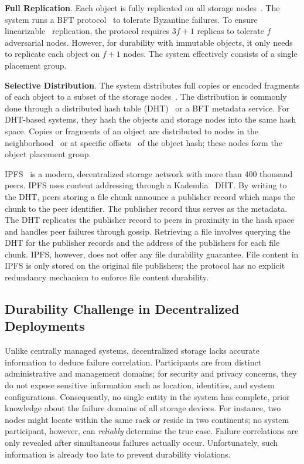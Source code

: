 \noindent\textbf{Full Replication}.
Each object is fully replicated on all storage nodes~\cite{bitcoin,ethereum,fabric}.
The system runs a BFT protocol~\cite{pbft,hotstuff,algorand} to tolerate Byzantine failures.
To ensure linearizable~\cite{linearizability} replication, the protocol requires $3f + 1$ replicas to tolerate $f$ adversarial nodes.
However, for durability with immutable objects, it only needs to replicate each object on $f + 1$ nodes.
The system effectively consists of a single placement group.

\noindent\textbf{Selective Distribution}.
The system distributes full copies or encoded fragments of each object to a subset of the storage nodes~\cite{farsite,past,cfs,glacier,carbonite,irisstore}.
The distribution is commonly done through a distributed hash table (DHT)~\cite{chash,chord,kademlia} or a BFT metadata service.
For DHT-based systems, they hash the objects and storage nodes into the same hash space.
Copies or fragments of an object are distributed to nodes in the neighborhood~\cite{cfs,past,carbonite} or at specific offsets~\cite{glacier} of the object hash;
these nodes form the object placement group.

IPFS~\cite{ipfs} is a modern, decentralized storage network with more than 400 thousand peers.
IPFS uses content addressing through a Kademlia~\cite{kademlia} DHT.
By writing to the DHT, peers storing a file chunk announce a publisher record which maps the chunk to the peer identifier.
The publisher record thus serves as the metadata.
The DHT replicates the publisher record to peers in proximity in the hash space and handles peer failures through gossip.
Retrieving a file involves querying the DHT for the publisher records and the address of the publishers for each file chunk.
IPFS, however, does not offer any file durability guarantee.
File content in IPFS is only stored on the original file publishers;
the protocol has no explicit redundancy mechanism to enforce file content durability.

\subsection{Durability Challenge in Decentralized Deployments}
\label{sec:background:loss}

Unlike centrally managed systems, decentralized storage lacks accurate information to deduce failure correlation.
Participants are from distinct administrative and management domains;
for security and privacy concerns, they do not expose sensitive information such as location, identities, and system configurations.
Consequently, no single entity in the system has complete, prior knowledge about the failure domains of all storage devices.
\ifspace
For instance, two nodes might locate within the same rack or reside in two continents;
no system participant, however, can \emph{reliably} determine the true case.
\fi
Failure correlations are only revealed after simultaneous failures actually occur.
Unfortunately, such information is already too late to prevent durability violations.

